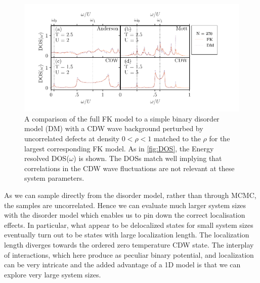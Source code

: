 \hypertarget{fig:DM_DOS}{%
\begin{figure}
\centering
\includegraphics[width=1\textwidth,height=\textheight]{figure_code/fk_chapter/disorder_model/DM_DOS}
\caption[{A comparison of the full FK model to a simple binary disorder model.}]{A comparison of the full FK model to a simple binary disorder model (DM) with a CDW wave background perturbed by uncorrelated defects at density \(0 < \rho < 1\) matched to the \(\rho\) for the largest corresponding FK model. As in \cref{fig:DOS}, the Energy resolved DOS(\(\omega\)) is shown. The DOSs match well implying that correlations in the CDW wave fluctuations are not relevant at these system parameters.}
\label{fig:DM_DOS}
\end{figure}
}

As we can sample directly from the disorder model, rather than through MCMC, the samples are uncorrelated. Hence we can evaluate much larger system sizes with the disorder model which enables us to pin down the correct localisation effects. In particular, what appear to be delocalized states for small system sizes eventually turn out to be states with large localization length. The localization length diverges towards the ordered zero temperature CDW state. The interplay of interactions, which here produce as peculiar binary potential, and localization can be very intricate and the added advantage of a 1D model is that we can explore very large system sizes.

